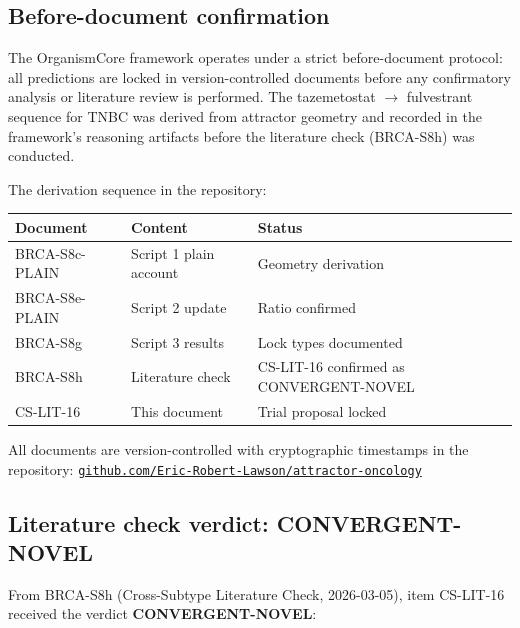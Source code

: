 \documentclass[12pt, a4paper]{article}
\begin{document}
\subsection{Before-document confirmation}

The OrganismCore framework operates under a strict
before-document protocol: all predictions are locked
in version-controlled documents before any confirmatory
analysis or literature review is performed. The
tazemetostat $\rightarrow$ fulvestrant sequence for
TNBC was derived from attractor geometry and recorded
in the framework's reasoning artifacts before the
literature check (BRCA-S8h) was conducted.

The derivation sequence in the repository:

\begin{center}
\begin{tabular}{lll}
\toprule
\textbf{Document} & \textbf{Content} & \textbf{Status} \\
\midrule
BRCA-S8c-PLAIN & Script 1 plain account
                & Geometry derivation \\
BRCA-S8e-PLAIN & Script 2 update
                & Ratio confirmed \\
BRCA-S8g       & Script 3 results
                & Lock types documented \\
BRCA-S8h       & Literature check
                & CS-LIT-16 confirmed as
                  CONVERGENT-NOVEL \\
CS-LIT-16      & This document
                & Trial proposal locked \\
\bottomrule
\end{tabular}
\end{center}

All documents are version-controlled with cryptographic
timestamps in the repository:
\href{https://github.com/Eric-Robert-Lawson/attractor-oncology}
{\texttt{github.com/Eric-Robert-Lawson/attractor-oncology}}

\subsection{Literature check verdict: CONVERGENT-NOVEL}

From BRCA-S8h (Cross-Subtype Literature Check,
2026-03-05), item CS-LIT-16 received the verdict
\textbf{CONVERGENT-NOVEL}:
\end{document}

